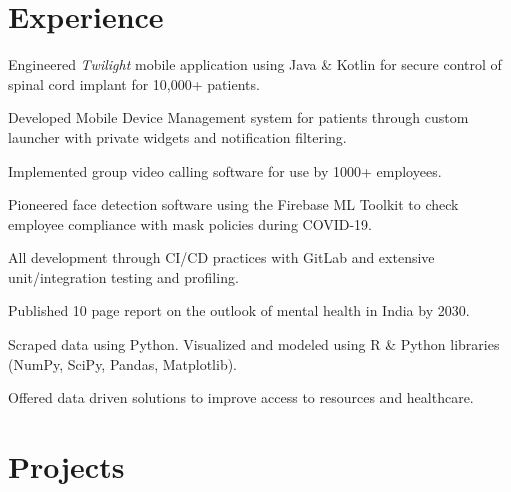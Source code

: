 \documentclass[]{saumya-resume}
\begin{document}
\begin{minipage}[t]{0.66\textwidth} 


\section{Experience}
\vspace{\topsep} %
\begin{tightemize}
\item Engineered \emph{Twilight} mobile application using Java \& Kotlin for secure control of spinal cord implant for 10,000+ patients.
\item Developed Mobile Device Management system for patients through custom launcher with private widgets and notification filtering.
\item Implemented group video calling software for use by 1000+ employees.
\item Pioneered face detection software using the Firebase ML Toolkit to check employee compliance with mask policies during COVID-19.
\item All development through CI/CD practices with GitLab and extensive unit/integration testing and profiling.
\end{tightemize}
\sectionsep

\begin{tightemize}
\item Published 10 page report on the outlook of mental health in India by 2030.
\item Scraped data using Python. Visualized and modeled using R \& Python libraries (NumPy, SciPy, Pandas, Matplotlib).
\item Offered data driven solutions to improve access to resources and healthcare.
\end{tightemize}
\sectionsep


\section{Projects}


\end{minipage}
\end{document}

